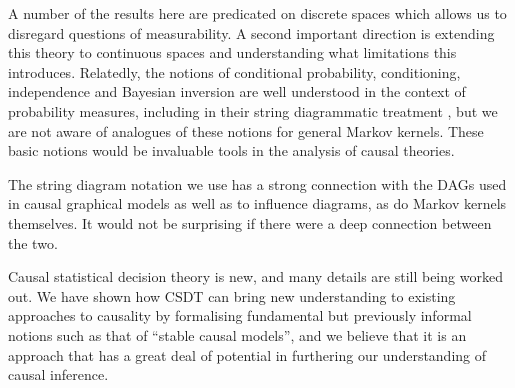 A number of the results here are predicated on discrete spaces which allows us to disregard questions of measurability. A second important direction is extending this theory to continuous spaces and understanding what limitations this introduces. Relatedly, the notions of conditional probability, conditioning, independence and Bayesian inversion are well understood in the context of probability measures, including in their string diagrammatic treatment \citep{cho_disintegration_2019}, but we are not aware of analogues of these notions for general Markov kernels. These basic notions would be invaluable tools in the analysis of causal theories.

The string diagram notation we use has a strong connection with the DAGs \citep{fong_causal_2013} used in causal graphical models as well as to influence diagrams\citep{dawid_influence_2002}, as do Markov kernels themselves. It would not be surprising if there were a deep connection between the two. 

Causal statistical decision theory is new, and many details are still being worked out. We have shown how CSDT can bring new understanding to existing approaches to causality by formalising fundamental but previously informal notions such as that of ``stable causal models'', and we believe that it is an approach that has a great deal of potential in furthering our understanding of causal inference. 
